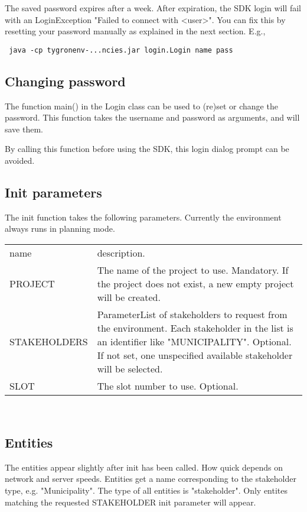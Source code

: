 \documentclass[english,11pt]{article}
\begin{document}
The saved password expires after a week. After expiration, the SDK login will fail with an LoginException "Failed to connect with \textless user\textgreater". You can fix this by resetting your password manually as explained in the next section. E.g., 

\texttt{ java -cp tygronenv-...ncies.jar login.Login name pass}

\subsection{Changing password}
The function main() in the Login class can be used to (re)set or change the password. 
This function takes the username and password as arguments, and will save them. 

By calling this function before using the SDK, this  login dialog prompt can be avoided. 

\subsection{Init parameters}
The init function takes the following parameters. Currently the environment always runs in planning mode.

\begin{tabularx}{\textwidth}{lX}
 name & description. \\
 PROJECT & The name of the project to use.  Mandatory. If the project does not exist, a new empty project will be created. \\
 STAKEHOLDERS & ParameterList of stakeholders to request from the environment. Each stakeholder in the list is an identifier like "MUNICIPALITY". Optional. If not set, one unspecified available stakeholder will be selected. \\
 SLOT &  The slot number to use.  Optional.  \\
\end{tabularx}\\


\subsection{Entities}
The entities appear slightly after init has been called. How quick depends on network and server speeds.
Entities get a name corresponding to the stakeholder type, e.g. "Municipality". The type of all entities is "stakeholder".
Only entites matching the requested STAKEHOLDER init parameter will appear.

\end{document}
